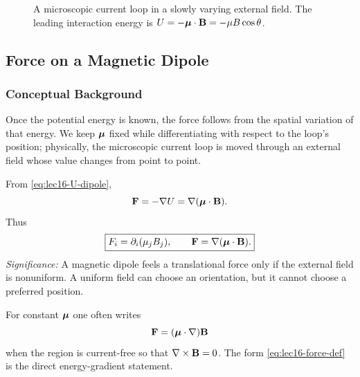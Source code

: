 \begin{figure}[h]
\centering
{}
\caption{A microscopic current loop in a slowly varying external field.  The leading
interaction energy is $U=-\boldsymbol{\mu}\cdot\mathbf{B}=-\mu B\cos\theta$.}
\label{fig:lec16-loop-field-energy}
\end{figure}

\subsection{Force on a Magnetic Dipole}\label{subsec:lec16-force}

\subsubsection*{Conceptual Background}
Once the potential energy is known, the force follows from the spatial variation of
that energy.  We keep $\boldsymbol{\mu}$ fixed while differentiating with respect to the loop's
position; physically, the microscopic current loop is moved through an external field
whose value changes from point to point.

From \eqref{eq:lec16-U-dipole},
\begin{equation}\label{eq:lec16-force-def}
  \mathbf{F}=-\nabla U
  =\nabla(\boldsymbol{\mu}\cdot\mathbf{B}).
\end{equation}
Thus
\begin{equation}\label{eq:lec16-force}
  \boxed{
    F_i=\partial_i(\mu_j B_j),
    \qquad
    \mathbf{F}=\nabla(\boldsymbol{\mu}\cdot\mathbf{B}).
  }
\end{equation}
\textit{Significance:} A magnetic dipole feels a translational force only if the
external field is nonuniform.  A uniform field can choose an orientation, but it cannot
choose a preferred position.

For constant $\boldsymbol{\mu}$ one often writes
\begin{equation}\label{eq:lec16-force-alt}
  \mathbf{F}=(\boldsymbol{\mu}\cdot\nabla)\mathbf{B}
\end{equation}
when the region is current-free so that $\nabla\times\mathbf{B}=0$.  The form
\eqref{eq:lec16-force-def} is the direct energy-gradient statement.

